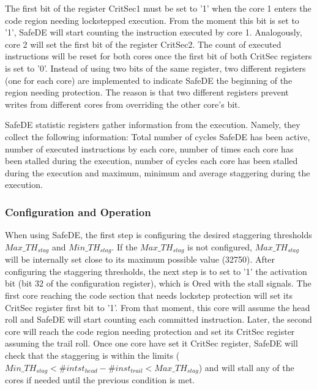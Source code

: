 The first bit of the register CritSec1 must be set to '1' when the core 1 enters the code region needing lockstepped execution. From the moment this bit is set to '1', SafeDE will start counting the instruction executed by core 1. Analogously, core 2 will set the first bit of the register CritSec2. The count of executed instructions will be reset for both cores once the first bit of both CritSec registers is set to '0'. Instead of using two bits of the same register, two different registers (one for each core) are implemented to indicate SafeDE the beginning of the region needing protection. The reason is that two different registers prevent writes from different cores from overriding the other core's bit.

SafeDE statistic registers gather information from the execution. Namely, they collect the following information: Total number of cycles SafeDE has been active, number of executed instructions by each core, number of times each core has been stalled during the execution, number of cycles each core has been stalled during the execution and maximum, minimum and average staggering during the execution.





\subsubsection{Configuration and Operation}

When using SafeDE, the first step is configuring the desired staggering thresholds $Max\_TH_{stag}$ and $Min\_TH_{stag}$. If the $Max\_TH_{stag}$ is not configured, $Max\_TH_{stag}$ will be internally set close to its maximum possible value (32750). After configuring the staggering thresholds, the next step is to set to '1' the activation bit (bit 32 of the configuration register), which is Ored with the stall signals. The first core reaching the code section that needs lockstep protection will set its CritSec register first bit to '1'. From that moment, this core will assume the head roll and SafeDE will start counting each committed instruction. Later, the second core will reach the code region needing protection and set its CritSec register assuming the trail roll. Once one core have set it CritSec register, SafeDE will check that the staggering is within the limits ($Min\_TH_{stag} < \#intst_{head} - \#inst_{trail} < Max\_TH_{stag}$) and will stall any of the cores if needed until the previous condition is met.  

